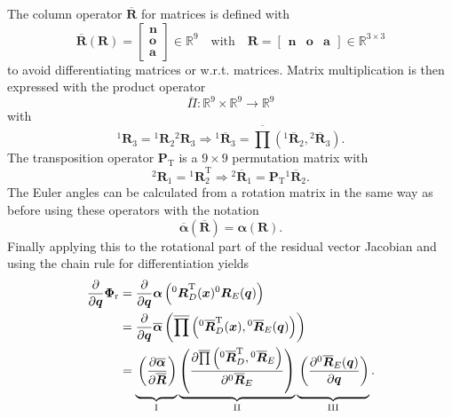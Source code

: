 \documentclass{svproc}
\newcommand{\bm}[1]{\boldsymbol{#1}}
\newcommand{\rotmat}[2]{{{ }^{#1}\boldsymbol{R}}_{#2}}
\newcommand{\rotmato}[2]{{{ }^{#1}\boldsymbol{\overline{R}}}_{#2}}
\newcommand{\transp}[0]{{\mathrm{T}}}
\begin{document}
The column operator $\overline{\bm{R}}$ for matrices is defined with
%
\begin{equation}
\overline{\bm{R}}(\bm{R})=\begin{bmatrix}
\bm{n} \\ \bm{o} \\ \bm{a}
\end{bmatrix} \in {\mathbb{R}}^{9}
\quad
\mathrm{with}
\quad
\bm{R}=\begin{bmatrix}
\bm{n} & \bm{o} & \bm{a}
\end{bmatrix}
 \in {\mathbb{R}}^{3 \times 3}
\end{equation}
%
to avoid differentiating matrices or w.r.t. matrices.
Matrix multiplication is then expressed with the product operator
%
\begin{equation}
\overline{\Pi}: {\mathbb{R}}^{9} \times {\mathbb{R}}^{9} \rightarrow {\mathbb{R}}^{9}
\label{equ:matprod_def}
\end{equation}
%
with
%
\begin{equation}
\rotmat{1}{3}
=
\rotmat{1}{2}
\rotmat{2}{3}
\Rightarrow
\rotmato{1}{3}
=
\overline{\prod}\left( \rotmato{1}{2}, \rotmato{2}{3}\right).
\label{equ:matprod}
\end{equation}
%
The transposition operator $\bm{P}_\transp$ is a $9 \times 9$ permutation matrix with
%
\begin{equation}
\rotmat{2}{1}
=
\rotmat{1}{2}^\transp
\Rightarrow
\rotmato{2}{1}
=
\bm{P}_\transp \rotmato{1}{2}.
\end{equation}
%
The Euler angles can be calculated from a rotation matrix in the same way as before using these operators with the notation
%
\begin{equation}
\overline{\bm{\alpha}}(\overline{\bm{R}})
=
\bm{\alpha}(\bm{R}).
\end{equation}
%
Finally applying this to the rotational part of the residual vector Jacobian and using the chain rule for differentiation yields
%
\begin{align}
\frac{\partial}{\partial \bm{q}}\bm{\Phi}_{\mathrm{r}}
&=
\frac{\partial}{\partial \bm{q}} \bm{\alpha}\left(\rotmat{0}{D}^\transp(\bm{x}) \rotmat{0}{E}(\bm{q})\right) \label{equ:grad_Phi_q}\\
&=
\frac{\partial}{\partial \bm{q}} \overline{\bm{\alpha}}\left(\overline{\prod}\left( \rotmato{0}{D}^\transp(\bm{x}), \rotmato{0}{E}(\bm{q})\right)\right) \nonumber \\
&=
\underbrace{\vphantom{\left(\frac{\partial \overline{\prod}\left(\rotmato{0}{D}^\transp, \rotmato{0}{E}\right)}{\partial \rotmato{0}{E}}\right)}\left(\frac{\partial \overline{\bm{\alpha}}}{\partial \overline{\bm{R}}}\right)}_{\mathrm{I}}
\underbrace{\left(\frac{\partial \overline{\prod}\left(\rotmato{0}{D}^\transp, \rotmato{0}{E}\right)}{\partial \rotmato{0}{E}}\right)}_{\mathrm{II}}
\underbrace{\vphantom{\left(\frac{\partial \overline{\prod}\left(\rotmato{0}{D}^\transp, \rotmato{0}{E}\right)}{\partial \rotmato{0}{E}}\right)}\left(\frac{\partial \rotmato{0}{E}(\bm{q})}{\partial \bm{q}} \right)}_{\mathrm{III}}.  \nonumber
\end{align}
\end{document}
